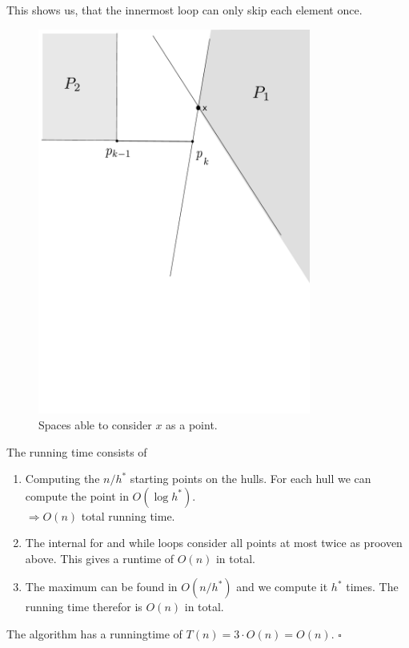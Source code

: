 \documentclass[11pt,a4paper,ngerman]{article}
\begin{document}
\begin{description}
\begin{enumerate}[a)]
        This shows us, that the innermost loop can only skip each element once.
        \begin{figure}[tb]
            \centering
            \includegraphics[clip, trim = 0mm 14cm 5mm 7mm, width = 0.8\textwidth]{pictures/itHull}
            \caption{Spaces able to consider $x$ as a point.}
            \label{alge:ueb2:hullOn}
        \end{figure}

        The running time consists of
        \begin{enumerate}[1)]
            \item Computing the $n / h^*$ starting points on the hulls.
                For each hull we can compute the point in $O(\log h^*)$.\\
                $\Rightarrow O(n)$ total running time.
            \item The internal for and while loops consider all points at most
                twice as prooven above. This gives a runtime of $O(n)$ in total.
            \item The maximum can be found in $O(n / h^*)$ and we compute it $h^*$
                times. The running time therefor is $O(n)$ in total.
        \end{enumerate}
        The algorithm has a runningtime of $T(n) = 3 \cdot O(n) = O(n)$.
        \mbox{}\hfill$\square$ 


\end{enumerate}
\end{description}
\end{document}
